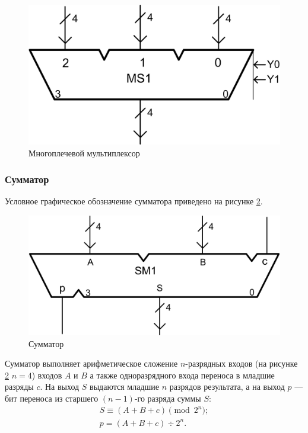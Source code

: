 \begin{figure}[!ht]
    \centering
    \includegraphics{fig/muxbig}
    \caption{Многоплечевой мультиплексор}
    \label{fig::ch::practice::muxbig}
\end{figure}


\subsubsection{Сумматор}

Условное графическое обозначение сумматора приведено на рисунке \ref{fig::ch::practice::summator}.
\begin{figure}[!ht]
    \centering
    \includegraphics{fig/summator}
    \caption{Сумматор}
    \label{fig::ch::practice::summator}
\end{figure}

Сумматор выполняет арифметическое сложение $n$-разрядных входов (на рисунке \ref{fig::ch::practice::summator} $n=4$) входов $A$ и $B$ а также одноразрядного входа переноса в младшие разряды $c$. На выход $S$ выдаются младшие $n$ разрядов результата, а на выход $p$ --- бит переноса из старшего $(n-1)$-го разряда суммы $S$:
\begin{align*}
    S \equiv (A + B + c) \pmod{2^n};\\
    p = (A + B + c) \div{2^n}.
\end{align*}


